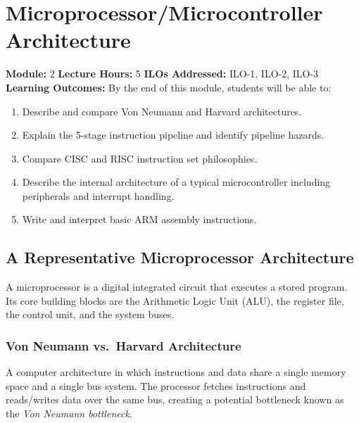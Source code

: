 
\chapter{Microprocessor/Microcontroller Architecture}
\label{ch:architecture}

\begin{moduleinfo}
  \textbf{Module:} 2 \quad
  \textbf{Lecture Hours:} 5 \quad
  \textbf{ILOs Addressed:} ILO-1, ILO-2, ILO-3 \\[4pt]
  \textbf{Learning Outcomes:} By the end of this module, students will be able to:
  \begin{enumerate}[nosep]
    \item Describe and compare Von Neumann and Harvard architectures.
    \item Explain the 5-stage instruction pipeline and identify pipeline hazards.
    \item Compare CISC and RISC instruction set philosophies.
    \item Describe the internal architecture of a typical microcontroller including peripherals and interrupt handling.
    \item Write and interpret basic ARM assembly instructions.
  \end{enumerate}
\end{moduleinfo}

\section{A Representative Microprocessor Architecture}
\label{sec:arch:rep}

A microprocessor is a digital integrated circuit that executes a stored program. Its core building blocks are the Arithmetic Logic Unit (ALU), the register file, the control unit, and the system buses.

\subsection{Von Neumann vs.\ Harvard Architecture}

\begin{definition}
A computer architecture in which instructions and data share a single memory space and a single bus system. The processor fetches instructions and reads/writes data over the same bus, creating a potential bottleneck known as the \emph{Von Neumann bottleneck}.
\end{definition}

